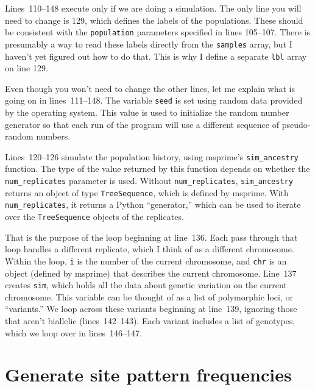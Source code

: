 \documentclass[11pt]{article}
\begin{document}
Lines~110--148 execute only if we are doing a simulation. The only
line you will need to change is 129, which defines the labels of the
populations. These should be consistent with the \texttt{population}
parameters specified in lines 105--107. There is presumably a way to
read these labels directly from the \texttt{samples} array, but I
haven't yet figured out how to do that. This is why I define a
separate \texttt{lbl} array on line 129.

Even though you won't need to change the other lines, let me explain
what is going on in lines~111--148. The variable \texttt{seed} is set
using random data provided by the operating system. This value is used
to initialize the random number generator so that each run of the
program will use a different sequence of pseudo-random numbers.

Lines~120--126 simulate the population history, using msprime's
\verb|sim_ancestry| function. The type of the value returned by this
function depends on whether the \verb|num_replicates| parameter is
used. Without \verb|num_replicates|, \verb|sim_ancestry| returns an
object of type \texttt{TreeSequence}, which is defined by
msprime. With \verb|num_replicates|, it returns a Python
``generator,'' which can be used to iterate over the
\texttt{TreeSequence} objects of the replicates.

That is the purpose of the loop beginning at line~136. Each pass
through that loop handles a different replicate, which I think of as a
different chromosome. Within the loop, \texttt{i} is the number of the
current chromosome, and \texttt{chr} is an object (defined by msprime)
that describes the current chromosome. Line~137 creates \texttt{sim},
which holds all the data about genetic variation on the current
chromosome. This variable can be thought of as a list of polymorphic
loci, or ``variants.'' We loop across these variants beginning at
line~139, ignoring those that aren't biallelic (lines~142--143).
Each variant includes a list of genotypes, which we loop over in
lines~146--147.

\section{Generate site pattern frequencies}
\end{document}
